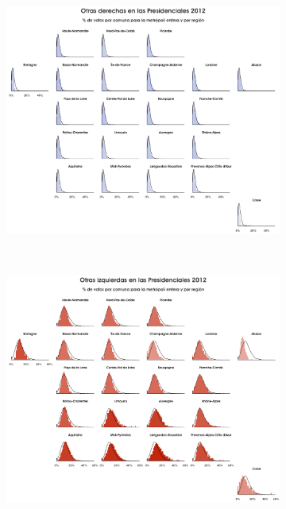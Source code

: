 \begin{figure}[h]
\begin{subfigure}{0.3\textwidth}
	\includegraphics[width = \textwidth]{Figs/AED/Geofacet_Distr_por_Reg_P12_Otras_derechas}
	\end{subfigure}
	~
	\begin{subfigure}{0.3\textwidth}
	\includegraphics[width = \textwidth]{Figs/AED/Geofacet_Distr_por_Reg_P12_Otras_izquierdas}
	\end{subfigure}
	~
	\begin{subfigure}{0.3\textwidth}

\end{subfigure}
\end{figure}
